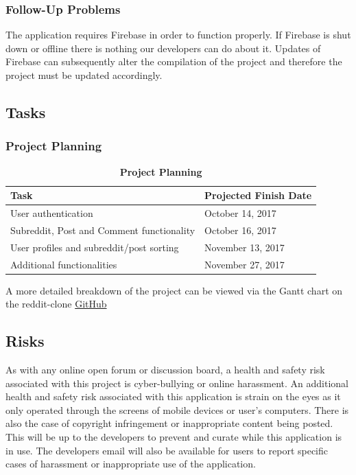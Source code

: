 \documentclass[12pt,fleqn]{article}
\begin{document}
\subsubsection {Follow-Up Problems}
The application requires Firebase in order to function properly. If Firebase is shut down or offline there is nothing our developers can do about it.  Updates of Firebase can subsequently alter the compilation of the project and therefore the project must be updated accordingly.  

\subsection {Tasks}

\subsubsection{Project Planning}

\begin{table}[H]
\caption{\bf Project Planning }
\begin{tabularx}{\textwidth}{p{10cm}X}
\toprule {\bf Task} & {\bf Projected Finish Date}\\
\midrule
User authentication & October 14, 2017 \\
Subreddit, Post and Comment functionality & October 16, 2017 \\
User profiles and subreddit/post sorting & November 13, 2017 \\
Additional functionalities & November 27, 2017 \\
\bottomrule
\end{tabularx}
\end{table}

A more detailed breakdown of the project can be viewed via the Gantt chart on the reddit-clone \href{https://gitlab.cas.mcmaster.ca/trudeaua/reddit-clone.git}{GitHub}

\subsection {Risks}
As with any online open forum or discussion board, a health and safety risk associated with this project is cyber-bullying or online harassment. An additional health and safety risk associated with this application is strain on the eyes as it only operated through the screens of mobile devices or user's computers. There is also the case of copyright infringement or inappropriate content being posted. This will be up to the developers to prevent and curate while this application is in use.  The developers email will also be available for users to report specific cases of harassment or inappropriate use of the application. \\
\end{document}
